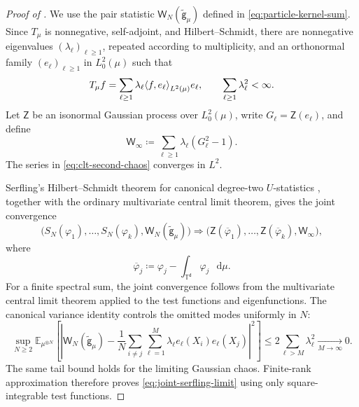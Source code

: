 \documentclass[11pt,reqno]{amsart}
\numberwithin{equation}{section}
\theoremstyle{plain}
\theoremstyle{definition}
\DeclarePairedDelimiter{\ip}{\langle}{\rangle}
\renewcommand{\d}{\mathsf d}
\newcommand{\dd}{\mathop{}\!\mathrm d}
\newcommand{\T}{\mathbb T}
\newcommand{\E}{\mathbb E}
\newcommand{\g}{\mathsf g}
\newcommand{\tl}{\widetilde}
\begin{document}
\begin{proof}[Proof of ]
We use the pair statistic $\mathsf W_N(\tl{\g}_{\mu})$ defined in \eqref{eq:particle-kernel-sum}.
Since $T_{\mu}$ is nonnegative, self-adjoint, and Hilbert--Schmidt, there are nonnegative eigenvalues $(\lambda_\ell)_{\ell\geq1}$, repeated according to multiplicity, and an orthonormal family $(e_\ell)_{\ell\geq1}$ in $L_0^2(\mu)$ such that
\begin{equation}
 T_{\mu}f
 =\sum_{\ell\geq1}\lambda_\ell
 \ip*{f,e_\ell}_{L^2(\mu)}e_\ell,
 \qquad
 \sum_{\ell\geq1}\lambda_\ell^2<\infty.
 \label{eq:clt-spectral-resolution}
\end{equation}
Let $\mathsf Z$ be an isonormal Gaussian process over $L_0^2(\mu)$, write $G_\ell=\mathsf Z(e_\ell)$, and define
\begin{equation}
 \mathsf W_\infty
 \coloneqq\sum_{\ell\geq1}\lambda_\ell(G_\ell^2-1).
 \label{eq:clt-second-chaos}
\end{equation}
The series in \eqref{eq:clt-second-chaos} converges in $L^2$.

Serfling's Hilbert--Schmidt theorem for canonical degree-two $U$-statistics \cite[Section~5.5.2]{Serfling1980}, together with the ordinary multivariate central limit theorem, gives the joint convergence
\begin{equation}
 \bigl(S_N(\varphi_1),\ldots,S_N(\varphi_k),\mathsf W_N(\tl{\g}_{\mu})\bigr)
 \Longrightarrow
 \bigl(\mathsf Z(\overline\varphi_1),\ldots,
 \mathsf Z(\overline\varphi_k),\mathsf W_\infty\bigr),
 \label{eq:joint-serfling-limit}
\end{equation}
where
\begin{equation}
 \overline\varphi_j
 \coloneqq\varphi_j-\int_{\T^{\d}}\varphi_j\,\dd\mu.
 \label{eq:centered-test-function}
\end{equation}
For a finite spectral sum, the joint convergence follows from the multivariate central limit theorem applied to the test functions and eigenfunctions. The canonical variance identity controls the omitted modes uniformly in $N$:
\begin{equation}
 \sup_{N\geq2}\E_{\mu^{\otimes N}}\left[
 \left|\mathsf W_N(\tl{\g}_{\mu})
 -\frac1N\sum_{i\ne j}\sum_{\ell=1}^{M}
 \lambda_\ell e_\ell(X_i)e_\ell(X_j)\right|^2\right]
 \leq 2\sum_{\ell>M}\lambda_\ell^2
 \xrightarrow[M\to\infty]{}0.
 \label{eq:clt-spectral-tail-uniform}
\end{equation}
The same tail bound holds for the limiting Gaussian chaos. Finite-rank approximation therefore proves \eqref{eq:joint-serfling-limit} using only square-integrable test functions.


\end{proof}
\end{document}
